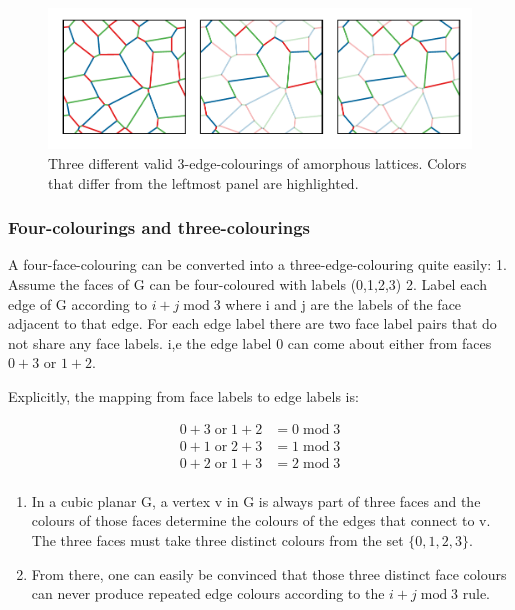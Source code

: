 \begin{figure}
\hypertarget{fig:multiple_colourings}{%
\centering
\includegraphics[width=1\textwidth,height=\textheight]{figure_code/amk_chapter/multiple_colourings/multiple_colourings}
\caption[Colourings of an Amorphous Lattice]{Three different valid 3-edge-colourings of amorphous lattices.
Colors that differ from the leftmost panel are
highlighted.}\label{fig:multiple_colourings}
}
\end{figure}

\hypertarget{four-colourings-and-three-colourings}{%
\subsubsection{Four-colourings and three-colourings}\label{four-colourings-and-three-colourings}}

A four-face-colouring can be converted into a three-edge-colouring quite easily: 1. Assume the faces of G can be four-coloured with labels (0,1,2,3) 2. Label each edge of G according to \(i + j \;\textrm{mod}\; 3\) where i and j are the labels of the face adjacent to that edge. For each edge label there are two face label pairs that do not share any face labels. i,e the edge label \(0\) can come about either from faces \(0 + 3\) or \(1 + 2\).

Explicitly, the mapping from face labels to edge labels is:

\[\begin{aligned}
0 + 3 \;\mathrm{or}\; 1 + 2 &= 0 \;\mathrm{mod}\; 3\\ 
0 + 1 \;\mathrm{or}\; 2 + 3 &= 1 \;\mathrm{mod}\; 3\\
0 + 2 \;\mathrm{or}\;1 + 3 &= 2 \;\mathrm{mod}\; 3\\
\end{aligned}
\]

\begin{enumerate}
\def\labelenumi{\arabic{enumi}.}
\setcounter{enumi}{2}
\item
  In a cubic planar G, a vertex v in G is always part of three faces and the colours of those faces determine the colours of the edges that connect to v. The three faces must take three distinct colours from the set \(\{0,1,2,3\}\).
\item
  From there, one can easily be convinced that those three distinct face colours can never produce repeated edge colours according to the \(i+j \;\mathrm{mod}\; 3\) rule.
\end{enumerate}

